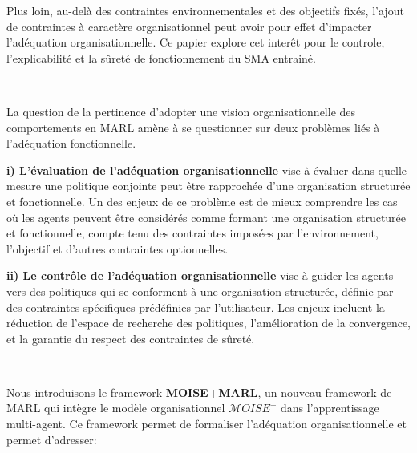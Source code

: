 \documentclass[sigconf,anonymous]{aamas}
\begin{document}
Plus loin, au-delà des contraintes environnementales et des objectifs fixés, l'ajout de contraintes à caractère organisationnel peut avoir pour effet d'impacter l'adéquation organisationnelle. Ce papier explore cet interêt pour le controle, l'explicabilité et la sûreté de fonctionnement du SMA entrainé.

\

\noindent La question de la pertinence d'adopter une vision organisationnelle des comportements en MARL amène à se questionner sur deux problèmes liés à l'adéquation fonctionnelle.

\quad \textbf{i) L'évaluation de l'adéquation organisationnelle} vise à évaluer dans quelle mesure une politique conjointe peut être rapprochée d'une organisation structurée et fonctionnelle. Un des enjeux de ce problème est de mieux comprendre les cas où les agents peuvent être considérés comme formant une organisation structurée et fonctionnelle, compte tenu des contraintes imposées par l'environnement, l'objectif et d'autres contraintes optionnelles.

\quad \textbf{ii) Le contrôle de l'adéquation organisationnelle} vise à guider les agents vers des politiques qui se conforment à une organisation structurée, définie par des contraintes spécifiques prédéfinies par l'utilisateur.
Les enjeux incluent la réduction de l'espace de recherche des politiques, l'amélioration de la convergence, et la garantie du respect des contraintes de sûreté.

\

\noindent Nous introduisons le framework \textbf{MOISE+MARL}, un nouveau framework de MARL qui intègre le modèle organisationnel $\mathcal{M}OISE^+$ dans l'apprentissage multi-agent. Ce framework permet de formaliser l'adéquation organisationnelle et permet d'adresser:
\end{document}
